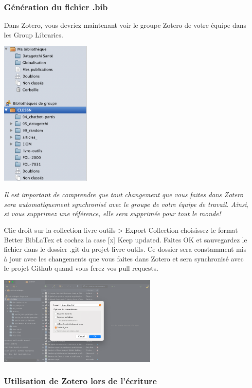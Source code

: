 \documentclass[
  letterpaper,
  DIV=11,
  numbers=noendperiod]{scrreprt}
\begin{document}
\subsubsection{Génération du fichier
.bib}\label{guxe9nuxe9ration-du-fichier-.bib}

Dans Zotero, vous devriez maintenant voir le groupe Zotero de votre
équipe dans les Group Libraries.

\includegraphics[width=1.77083in,height=\textheight]{images/chapitre6_zotero.png}

\emph{Il est important de comprendre que tout changement que vous faites
dans Zotero sera automatiquement synchronisé avec le groupe de votre
équipe de travail. Ainsi, si vous supprimez une référence, elle sera
supprimée pour tout le monde!}

Clic-droit sur la collection livre-outils \textgreater{} Export
Collection choisissez le format Better BibLaTex et cochez la case
{[}x{]} Keep updated. Faites OK et sauvegardez le fichier dans le
dossier .git du projet livre-outils. Ce dossier sera constamment mis à
jour avec les changements que vous faites dans Zotero et sera
synchronisé avec le projet Github quand vous ferez vos pull requests.

\includegraphics[width=3.125in,height=\textheight]{images/chapitre6_biblatex.png}

\subsubsection{Utilisation de Zotero lors de
l'écriture}\label{utilisation-de-zotero-lors-de-luxe9criture}
\end{document}
